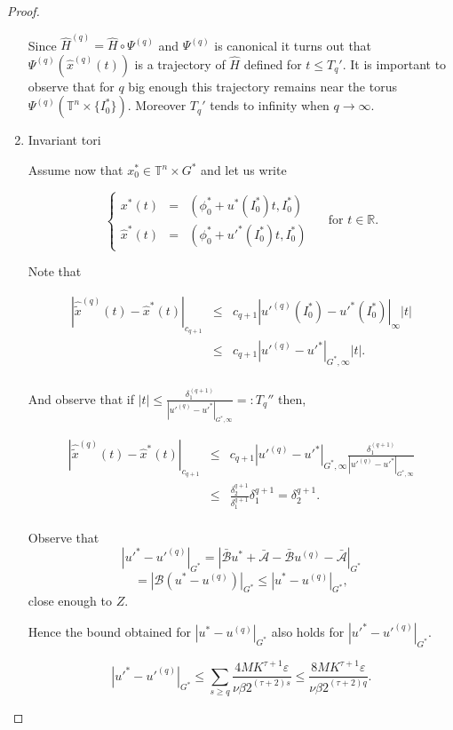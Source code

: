 \begin{proof}
\begin{enumerate}
Since $\hat H^{(q)} = \hat H \circ \Psi^{(q)}$ and $\Psi^{(q)}$ is canonical it turns out that $\Psi^{(q)}(\hat x^{(q)}(t))$ is a trajectory of $\hat H$ defined for $t \leq T_q'$. It is important to observe that for $q$ big enough this trajectory remains near the torus $\Psi^{(q)}(\mathbb{T}^n\times \{I_0^*\})$. Moreover $T_q'$ tends to infinity when $q \rightarrow \infty$.

\item Invariant tori

Assume now that $x_0^* \in \mathbb{T}^n\times G^*$ and let us write


$$
\left\{
\begin{array}{rcl}
x^* (t) &  = &  (\phi^*_0 + u^*(I_0^*)t, I_0^*) \\
\hat x^* (t) & = & (\phi^*_0 + u'^*(I_0^*)t, I_0^*)
\end{array}
\right.
\quad \text{ for } t\in\mathbb{R}.
$$

Note that

$$
\begin{array}{rcl}
|\hat{\tilde{x}}^{(q)}(t) - \hat{x}^*(t)|_{c_{q+1}} & \leq & c_{q+1}|u'^{(q)}(I_0^*) - u'^* (I_0^*)|_\infty |t|\\
 & \leq & c_{q+1}|u'^{(q)} - u'^* |_{G^*, \infty} |t|.\\
\end{array}
$$

And observe that if $|t| \leq \frac{\delta_1^{(q+1)}}{|u'^{(q)} - u'^*|_{G^* ,\infty}} =: T_q''$ then,

$$
\begin{array}{rcl}
|\hat{\tilde{x}}^{(q)}(t) - \hat{x}^*(t)|_{c_{q+1}} & \leq &  c_{q+1}|u'^{(q)} - u'^* |_{G^*, \infty} \frac{\delta_1^{(q+1)}}{|u'^{(q)} - u'^*|_{G^* ,\infty}}\\
 & \leq& \frac{\delta_2^{q+1}}{\delta_1^{q+1}}\delta_1^{q+1} = \delta_2^{q+1}.\\
\end{array}
$$

Observe that 
$$|u'^*  - u'^{(q)}|_{G^*} = |\bar{\mathcal{B}} u^* +\bar{\mathcal{A}} - \bar{\mathcal{B}} u^{(q)} - \bar{\mathcal{A}}|_{G^*}$$
$$ = |\mathcal{B}(u^* - u^{(q)})|_{G^*} \leq |u^* -u^{(q)}|_{G^*},$$
 close enough to $Z$.

Hence the bound obtained for $|u^* -u^{(q)}|_{G^*}$ also holds for $|u'^* -u'^{(q)}|_{G^*}$.

$$|u'^* -u'^{(q)}|_{G^*} \leq \sum_{s\geq q} \frac{4 M K^{\tau+1}\varepsilon}{\nu \beta 2^{(\tau+2)s}} \leq \frac{8 M K^{\tau+1}\varepsilon}{\nu\beta 2^{(\tau+2)q}}.$$


\end{enumerate}
\end{proof}

